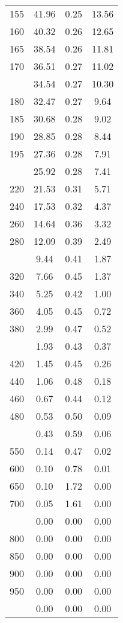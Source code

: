 \begin{table}[ht]
\begin{tabular}{lccc}
  155 & 41.96 & 0.25 & 13.56 \\ 
  160 & 40.32 & 0.26 & 12.65 \\ 
  165 & 38.54 & 0.26 & 11.81 \\ 
  170 & 36.51 & 0.27 & 11.02 \\ 
   \addlinespace
175 & 34.54 & 0.27 & 10.30 \\ 
  180 & 32.47 & 0.27 & 9.64 \\ 
  185 & 30.68 & 0.28 & 9.02 \\ 
  190 & 28.85 & 0.28 & 8.44 \\ 
  195 & 27.36 & 0.28 & 7.91 \\ 
   \addlinespace
200 & 25.92 & 0.28 & 7.41 \\ 
  220 & 21.53 & 0.31 & 5.71 \\ 
  240 & 17.53 & 0.32 & 4.37 \\ 
  260 & 14.64 & 0.36 & 3.32 \\ 
  280 & 12.09 & 0.39 & 2.49 \\ 
   \addlinespace
300 & 9.44 & 0.41 & 1.87 \\ 
  320 & 7.66 & 0.45 & 1.37 \\ 
  340 & 5.25 & 0.42 & 1.00 \\ 
  360 & 4.05 & 0.45 & 0.72 \\ 
  380 & 2.99 & 0.47 & 0.52 \\ 
   \addlinespace
400 & 1.93 & 0.43 & 0.37 \\ 
  420 & 1.45 & 0.45 & 0.26 \\ 
  440 & 1.06 & 0.48 & 0.18 \\ 
  460 & 0.67 & 0.44 & 0.12 \\ 
  480 & 0.53 & 0.50 & 0.09 \\ 
   \addlinespace
500 & 0.43 & 0.59 & 0.06 \\ 
  550 & 0.14 & 0.47 & 0.02 \\ 
  600 & 0.10 & 0.78 & 0.01 \\ 
  650 & 0.10 & 1.72 & 0.00 \\ 
  700 & 0.05 & 1.61 & 0.00 \\ 
   \addlinespace
750 & 0.00 & 0.00 & 0.00 \\ 
  800 & 0.00 & 0.00 & 0.00 \\ 
  850 & 0.00 & 0.00 & 0.00 \\ 
  900 & 0.00 & 0.00 & 0.00 \\ 
  950 & 0.00 & 0.00 & 0.00 \\ 
   \addlinespace
1000 & 0.00 & 0.00 & 0.00 \\ 
   \bottomrule
\end{tabular}
\end{table}
